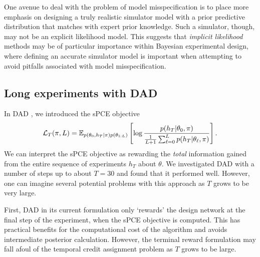 \documentclass[a4paper, 10pt]{report}
\theoremstyle{plain}
\begin{document}
	One avenue to deal with the problem of model misspecification is to place more emphasis on designing a truly realistic simulator model with a prior predictive distribution that matches with expert prior knowledge. Such a simulator, though, may not be an explicit likelihood model. 
	This suggests that \emph{implicit likelihood} methods \citep{kleinegesse2018efficient,kleinegesse2020sequential,ivanova2021implicit} may be of particular importance within Bayesian experimental design, where defining an accurate simulator model is important when attempting to avoid pitfalls associated with model misspecification.
	
	\subsection{Long experiments with DAD}
	In DAD \citep{foster2021dad}, we introduced the sPCE objective
	\begin{equation}
		\mathcal{L}_T(\pi,L) = \mathbb{E}_{p(\theta_0,h_T|\pi)p(\theta_{1:L})}\left[\log \frac{p(h_T|\theta_0,\pi)}{\frac{1}{L+1}\sum_{\ell=0}^L p(h_T|\theta_\ell,\pi)}\right].
	\end{equation}
	We can interpret the sPCE objective as rewarding the \emph{total} information gained from the entire sequence of experiments $h_T$ about $\theta$.
	We investigated DAD with a number of steps up to about $T=30$ and found that it performed well. However, one can imagine several potential problems with this approach as $T$ grows to be very large.
	
	First, DAD in its current formulation only `rewards' the design network at the final step of the experiment, when the sPCE objective is computed. This has practical benefits for the computational cost of the algorithm and avoids intermediate posterior calculation.
	However, the terminal reward formulation may fall afoul of the temporal credit assignment problem \citep{sutton1984temporal} as $T$ grows to be large.
	
\end{document}
